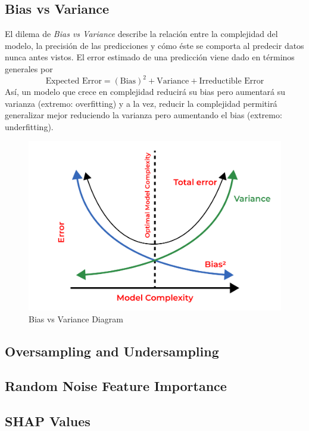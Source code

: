 \subsection{Bias vs Variance}

El dilema de \textit{Bias vs Variance} describe la relación entre la complejidad del modelo, la precisión de las predicciones y cómo éste se comporta al predecir datos nunca antes vistos. El error estimado de una predicción viene dado en términos generales por 
$$
\text{Expected Error} = (\text{Bias})^2 + \text{Variance} + \text{Irreductible Error}
$$
Así, un modelo que crece en complejidad reducirá su bias pero aumentará su varianza (extremo: overfitting) y a la vez, reducir la complejidad permitirá generalizar mejor reduciendo la varianza pero aumentando el bias (extremo: underfitting). 

\begin{figure}[H]
    \center
    \includegraphics[scale=0.27]{notebooks/Others/img/bias_vs_variance.png}
    \caption{Bias vs Variance Diagram}
\end{figure}

\subsection{Oversampling and Undersampling}

\subsection{Random Noise Feature Importance}

\subsection{SHAP Values}
\label{subsec:shap_values}

